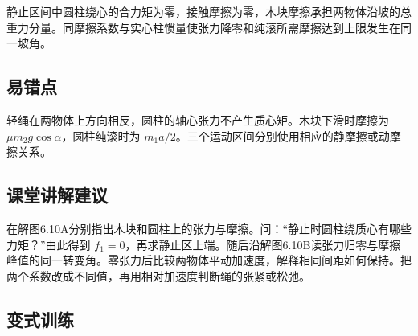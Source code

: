 \documentclass[UTF8,fontset=fandol,a4paper,11pt]{ctexart}
\begin{document}
静止区间中圆柱绕心的合力矩为零，接触摩擦为零，木块摩擦承担两物体沿坡的总重力分量。同摩擦系数与实心柱惯量使张力降零和纯滚所需摩擦达到上限发生在同一坡角。



\subsection*{易错点}

轻绳在两物体上方向相反，圆柱的轴心张力不产生质心矩。木块下滑时摩擦为 $\mu m_2g\cos\alpha$，圆柱纯滚时为 $m_1a/2$。三个运动区间分别使用相应的静摩擦或动摩擦关系。



\subsection*{课堂讲解建议}

在解图6.10A分别指出木块和圆柱上的张力与摩擦。问：“静止时圆柱绕质心有哪些力矩？”由此得到 $f_1=0$，再求静止区上端。随后沿解图6.10B读张力归零与摩擦峰值的同一转变角。零张力后比较两物体平动加速度，解释相同间距如何保持。把两个系数改成不同值，再用相对加速度判断绳的张紧或松弛。




\subsection*{变式训练}
\end{document}
